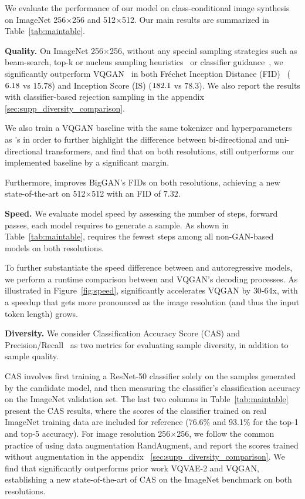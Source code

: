 We evaluate the performance of our model on class-conditional image synthesis on ImageNet 256$\times$256 and 512$\times$512. Our main results are summarized in Table~\ref{tab:maintable}.

\noindent\textbf{Quality.}
On ImageNet 256$\times$256, without any special sampling strategies such as beam-search, top-k or nucleus sampling heuristics~\cite{holtzman2019nucleus} or classifier guidance~\cite{Razavi19vqvae2}, we significantly outperform VQGAN~\cite{Esser21vqgan} in both Fr\'{e}chet Inception Distance (FID)~\cite{FID} ($6.18$ vs $15.78$) and Inception Score (IS) ($182.1$ vs $78.3$). We also report the results with classifier-based rejection sampling in the appendix \ref{sec:supp_diversity_comparison}. 

%
We also train a VQGAN baseline with the same tokenizer and hyperparameters as \model's in order to further highlight the difference between bi-directional and uni-directional transformers, and find that on both resolutions, \model still outperforms our implemented baseline by a significant margin. 

Furthermore, \model improves BigGAN's FIDs on both resolutions, achieving a new state-of-the-art on 512$\times$512 with an FID of $7.32$.


{


}


\noindent\textbf{Speed.} 
We evaluate model speed by assessing the number of steps, \ie forward passes, each model requires to generate a sample. As shown in Table~\ref{tab:maintable}, \model requires the fewest steps among all non-GAN-based models on both resolutions.

To further substantiate the speed difference between \model and autoregressive models, we perform a runtime comparison between \model and VQGAN's decoding processes. As illustrated in Figure~\ref{fig:speed}, \model significantly accelerates VQGAN by $30$-$64$x, with a speedup that gets more pronounced as the image resolution (and thus the input token length) grows.


\noindent\textbf{Diversity.} We consider Classification Accuracy Score (CAS) \cite{Ravuri19CAS} and Precision/Recall~\cite{KynkaanniemiKLL19} as two metrics for evaluating sample diversity, in addition to sample quality.

CAS involves first training a ResNet-50 classifier\cite{ResNet} solely on the samples generated by the candidate model, and then measuring the classifier's classification accuracy on the ImageNet validation set.
The last two columns in Table~\ref{tab:maintable} present the CAS results, where the scores of the classifier trained on real ImageNet training data are included for reference (76.6\% and 93.1\% for the top-1 and top-5 accuracy). For image resolution 256$\times$256,  we follow the common practice of using data augmentation RandAugment\cite{cubuk2019randaugment}, and report the scores trained without augmentation in the appendix ~\ref{sec:supp_diversity_comparison}. We find that \model significantly outperforms prior work VQVAE-2 and VQGAN, establishing a new state-of-the-art of CAS on the ImageNet benchmark on both resolutions.


